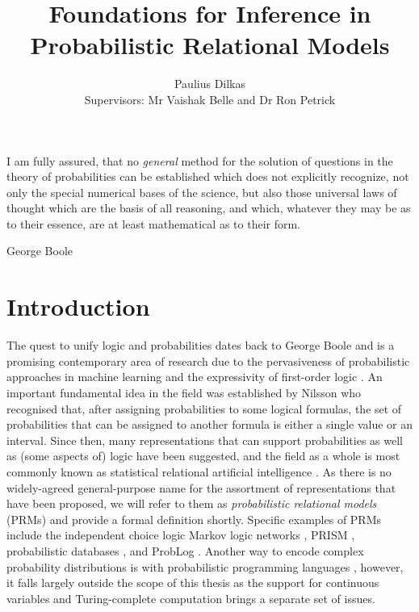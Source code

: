 \documentclass{article}
\title{Foundations for Inference in Probabilistic Relational Models}
\author{Paulius Dilkas \\[1ex] {\small Supervisors: Mr Vaishak Belle and Dr Ron
    Petrick}}
\affil{School of Informatics, University of Edinburgh}
\begin{document}
\maketitle

\epigraph{I am fully assured, that no \emph{general} method for the solution of
  questions in the theory of probabilities can be established which does not
  explicitly recognize, not only the special numerical bases of the science, but
  also those universal laws of thought which are the basis of all reasoning, and
  which, whatever they may be as to their essence, are at least mathematical as
  to their form.}{George Boole \cite{boole1854v}}

\section{Introduction}

The quest to unify logic and probabilities dates back to George Boole
\cite{boole1957laws} and is a promising contemporary area of research due to the
pervasiveness of probabilistic approaches in machine learning and the
expressivity of first-order logic
\cite{DBLP:series/sci/BrazAR08,DBLP:journals/cacm/Russell15}. An important
fundamental idea in the field was established by Nilsson
\cite{DBLP:journals/ai/Nilsson86} who recognised that, after assigning
probabilities to some logical formulas, the set of probabilities that can be
assigned to another formula is either a single value or an interval. Since then,
many representations that can support probabilities as well as (some aspects of)
logic have been suggested, and the field as a whole is most commonly known as
statistical relational artificial intelligence
\cite{DBLP:series/synthesis/2016Raedt}. As there is no widely-agreed
general-purpose name for the assortment of representations that have been
proposed, we will refer to them as \emph{probabilistic relational models} (PRMs)
and provide a formal definition shortly. Specific examples of PRMs include the
independent choice logic \cite{DBLP:journals/ai/Poole97} Markov logic networks
\cite{DBLP:journals/ml/RichardsonD06}, PRISM \cite{DBLP:conf/ijcai/SatoK97},
probabilistic databases \cite{DBLP:series/synthesis/2011Suciu}, and ProbLog
\cite{DBLP:conf/ijcai/RaedtKT07}. Another way to encode complex probability
distributions is with probabilistic programming languages
\cite{DBLP:conf/icse/GordonHNR14}, however, it falls largely outside the scope
of this thesis as the support for continuous variables and Turing-complete
computation brings a separate set of issues.
\end{document}
